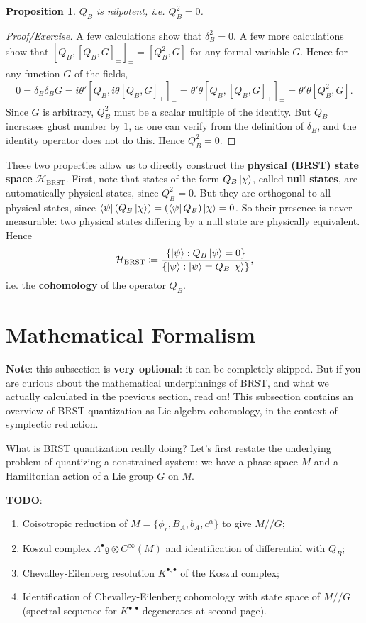 \documentclass{report}
\theoremstyle{plain}
\newtheorem{proposition}[theorem]{Proposition}
\theoremstyle{definition}
\theoremstyle{remark}
\newcommand{\cH}{\mathcal{H}}
\newcommand{\fg}{\mathfrak{g}}
\begin{document}
\begin{proposition}
  $Q_B$ is nilpotent, i.e. $Q_B^2 = 0$.
\end{proposition}

\begin{proof}[Proof/Exercise]
  A few calculations show that $\delta_B^2 = 0$. A few more
  calculations show that $[Q_B, [Q_B, G]_{\pm}]_{\mp} = [Q_B^2, G]$
  for any formal variable $G$. Hence for any function $G$ of the
  fields,
  \[ 0 = \delta_B \delta_B G = i\theta' [Q_B, i\theta [Q_B, G]_{\pm}]_{\pm} = \theta' \theta [Q_B, [Q_B, G]_{\pm}]_{\mp} = \theta' \theta [Q_B^2, G]. \]
  Since $G$ is arbitrary, $Q_B^2$ must be a scalar multiple of the
  identity. But $Q_B$ increases ghost number by $1$, as one can verify
  from the definition of $\delta_B$, and the identity operator does
  not do this. Hence $Q_B^2 = 0$.
\end{proof}

These two properties allow us to directly construct the {\bf physical
  (BRST) state space} $\cH_{\text{BRST}}$. First, note that states of
the form $Q_B\ket{\chi}$, called {\bf null states}, are automatically
physical states, since $Q_B^2 = 0$. But they are orthogonal to all
physical states, since $\bra{\psi}(Q_B\ket{\chi}) =
(\bra{\psi}Q_B)\ket{\chi} = 0$. So their presence is never measurable:
two physical states differing by a null state are physically
equivalent. Hence
\[ \cH_{\text{BRST}} \coloneqq \frac{\{\ket{\psi} : Q_B\ket{\psi} = 0\}}{\{\ket{\psi} : \ket{\psi} = Q_B\ket{\chi}\}}, \]
i.e. the {\bf cohomology} of the operator $Q_B$.

\section{Mathematical Formalism}

{\bf Note}: this subsection is {\bf very optional}: it can be
completely skipped. But if you are curious about the mathematical
underpinnings of BRST, and what we actually calculated in the previous
section, read on! This subsection contains an overview of BRST
quantization as Lie algebra cohomology, in the context of symplectic
reduction.

What is BRST quantization really doing? Let's first restate the
underlying problem of quantizing a constrained system: we have a phase
space $M$ and a Hamiltonian action of a Lie group $G$ on $M$.

{\color{blue} \bf TODO}:
\begin{enumerate}
\item Coisotropic reduction of $M = \{\phi_r, B_A, b_A, c^\alpha\}$ to
  give $M//G$;
\item Koszul complex $\Lambda^\bullet \fg \otimes C^\infty(M)$ and
  identification of differential with $Q_B$;
\item Chevalley-Eilenberg resolution $K^{\bullet,\bullet}$ of the
  Koszul complex;
\item Identification of Chevalley-Eilenberg cohomology with state
  space of $M//G$ (spectral sequence for $K^{\bullet,\bullet}$
  degenerates at second page).
\end{enumerate}
\end{document}
